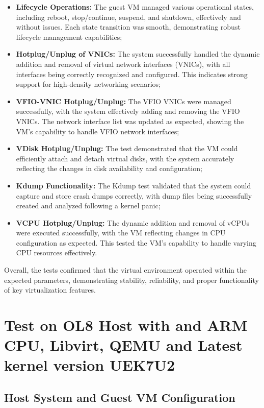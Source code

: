 \begin{itemize}
    \item \textbf{Lifecycle Operations:} The guest VM managed various operational states, including reboot, stop/continue, suspend, and shutdown, effectively and without issues. Each state transition was smooth, demonstrating robust lifecycle management capabilities;
    \item \textbf{Hotplug/Unplug of VNICs:} The system successfully handled the dynamic addition and removal of virtual network interfaces (VNICs), with all interfaces being correctly recognized and configured. This indicates strong support for high-density networking scenarios;
    \item \textbf{VFIO-VNIC Hotplug/Unplug:} The VFIO VNICs were managed successfully, with the system effectively adding and removing the VFIO VNICs. The network interface list was updated as expected, showing the VM’s capability to handle VFIO network interfaces;
    \item \textbf{VDisk Hotplug/Unplug:} The test demonstrated that the VM could efficiently attach and detach virtual disks, with the system accurately reflecting the changes in disk availability and configuration;
    \item \textbf{Kdump Functionality:} The Kdump test validated that the system could capture and store crash dumps correctly, with dump files being successfully created and analyzed following a kernel panic;
    \item \textbf{VCPU Hotplug/Unplug:} The dynamic addition and removal of vCPUs were executed successfully, with the VM reflecting changes in CPU configuration as expected. This tested the VM's capability to handle varying CPU resources effectively.
\end{itemize}

Overall, the tests confirmed that the virtual environment operated within the expected parameters, demonstrating stability, reliability, and proper functionality of key virtualization features.

\section{Test on OL8 Host with and ARM CPU, Libvirt, QEMU and Latest kernel version UEK7U2}

\subsection{Host System and Guest VM Configuration}

